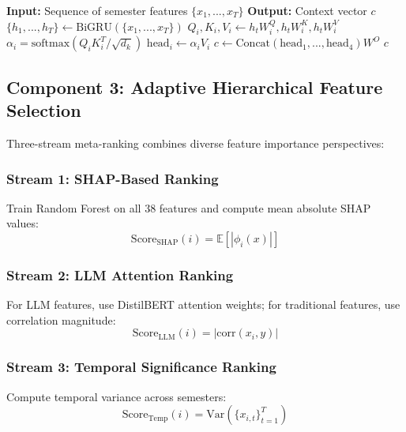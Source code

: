 \documentclass[journal]{IEEEtran}
\begin{document}
\begin{algorithm}[h]
\caption{Temporal Attention Computation}
\begin{algorithmic}[1]
\STATE \textbf{Input:} Sequence of semester features $\{x_1, ..., x_T\}$
\STATE \textbf{Output:} Context vector $c$
\STATE $\{h_1, ..., h_T\} \leftarrow \text{BiGRU}(\{x_1, ..., x_T\})$
    \STATE $Q_i, K_i, V_i \leftarrow h_t W_i^Q, h_t W_i^K, h_t W_i^V$
    \STATE $\alpha_i = \text{softmax}(Q_i K_i^T / \sqrt{d_k})$
    \STATE $\text{head}_i \leftarrow \alpha_i V_i$
\ENDFOR
\STATE $c \leftarrow \text{Concat}(\text{head}_1, ..., \text{head}_4)W^O$
\RETURN $c$
\end{algorithmic}
\end{algorithm}

\subsection{Component 3: Adaptive Hierarchical Feature Selection}

Three-stream meta-ranking combines diverse feature importance perspectives:

\subsubsection{Stream 1: SHAP-Based Ranking}
Train Random Forest on all 38 features and compute mean absolute SHAP values:
\begin{equation}
\text{Score}_\text{SHAP}(i) = \mathbb{E}[|\phi_i(x)|]
\end{equation}

\subsubsection{Stream 2: LLM Attention Ranking}
For LLM features, use DistilBERT attention weights; for traditional features, use correlation magnitude:
\begin{equation}
\text{Score}_\text{LLM}(i) = |\text{corr}(x_i, y)|
\end{equation}

\subsubsection{Stream 3: Temporal Significance Ranking}
Compute temporal variance across semesters:
\begin{equation}
\text{Score}_\text{Temp}(i) = \text{Var}(\{x_{i,t}\}_{t=1}^{T})
\end{equation}
\end{document}
